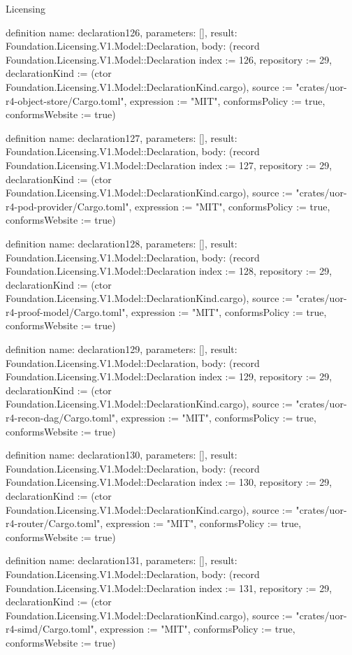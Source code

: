 \begin{lexlean}{Licensing}
\begin{semanticmodule}
definition{
  name: declaration126,
  parameters: [],
  result: Foundation.Licensing.V1.Model::Declaration,
  body: (record Foundation.Licensing.V1.Model::Declaration {index := 126, repository := 29, declarationKind := (ctor Foundation.Licensing.V1.Model::DeclarationKind.cargo), source := "crates/uor-r4-object-store/Cargo.toml", expression := "MIT", conformsPolicy := true, conformsWebsite := true})
}

definition{
  name: declaration127,
  parameters: [],
  result: Foundation.Licensing.V1.Model::Declaration,
  body: (record Foundation.Licensing.V1.Model::Declaration {index := 127, repository := 29, declarationKind := (ctor Foundation.Licensing.V1.Model::DeclarationKind.cargo), source := "crates/uor-r4-pod-provider/Cargo.toml", expression := "MIT", conformsPolicy := true, conformsWebsite := true})
}

definition{
  name: declaration128,
  parameters: [],
  result: Foundation.Licensing.V1.Model::Declaration,
  body: (record Foundation.Licensing.V1.Model::Declaration {index := 128, repository := 29, declarationKind := (ctor Foundation.Licensing.V1.Model::DeclarationKind.cargo), source := "crates/uor-r4-proof-model/Cargo.toml", expression := "MIT", conformsPolicy := true, conformsWebsite := true})
}

definition{
  name: declaration129,
  parameters: [],
  result: Foundation.Licensing.V1.Model::Declaration,
  body: (record Foundation.Licensing.V1.Model::Declaration {index := 129, repository := 29, declarationKind := (ctor Foundation.Licensing.V1.Model::DeclarationKind.cargo), source := "crates/uor-r4-recon-dag/Cargo.toml", expression := "MIT", conformsPolicy := true, conformsWebsite := true})
}

definition{
  name: declaration130,
  parameters: [],
  result: Foundation.Licensing.V1.Model::Declaration,
  body: (record Foundation.Licensing.V1.Model::Declaration {index := 130, repository := 29, declarationKind := (ctor Foundation.Licensing.V1.Model::DeclarationKind.cargo), source := "crates/uor-r4-router/Cargo.toml", expression := "MIT", conformsPolicy := true, conformsWebsite := true})
}

definition{
  name: declaration131,
  parameters: [],
  result: Foundation.Licensing.V1.Model::Declaration,
  body: (record Foundation.Licensing.V1.Model::Declaration {index := 131, repository := 29, declarationKind := (ctor Foundation.Licensing.V1.Model::DeclarationKind.cargo), source := "crates/uor-r4-simd/Cargo.toml", expression := "MIT", conformsPolicy := true, conformsWebsite := true})
}


\end{semanticmodule}
\end{lexlean}
